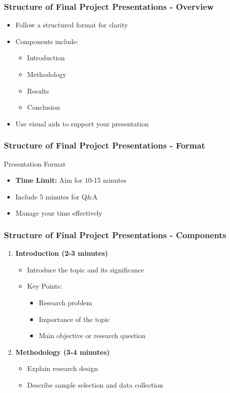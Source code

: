 \documentclass[aspectratio=169]{beamer}
\begin{document}
\begin{frame}[fragile]
    \frametitle{Structure of Final Project Presentations - Overview}
    \begin{itemize}
        \item Follow a structured format for clarity
        \item Components include:
        \begin{itemize}
            \item Introduction
            \item Methodology
            \item Results
            \item Conclusion
        \end{itemize}
        \item Use visual aids to support your presentation
    \end{itemize}
\end{frame}

\begin{frame}[fragile]
    \frametitle{Structure of Final Project Presentations - Format}
    \begin{block}{Presentation Format}
        \begin{itemize}
            \item \textbf{Time Limit:} Aim for 10-15 minutes
            \item Include 5 minutes for Q\&A
            \item Manage your time effectively
        \end{itemize}
    \end{block}
\end{frame}

\begin{frame}[fragile]
    \frametitle{Structure of Final Project Presentations - Components}
    \begin{enumerate}
        \item \textbf{Introduction (2-3 minutes)}
            \begin{itemize}
                \item Introduce the topic and its significance
                \item Key Points:
                \begin{itemize}
                    \item Research problem
                    \item Importance of the topic
                    \item Main objective or research question
                \end{itemize}
            \end{itemize}
        \item \textbf{Methodology (3-4 minutes)}
            \begin{itemize}
                \item Explain research design
                \item Describe sample selection and data collection
            \end{itemize}
    \end{enumerate}
\end{frame}
\end{document}
